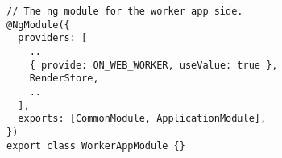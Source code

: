 \begin{verbatim}
// The ng module for the worker app side.
@NgModule({
  providers: [
    ..
    { provide: ON_WEB_WORKER, useValue: true },
    RenderStore,
    ..
  ],
  exports: [CommonModule, ApplicationModule],
})
export class WorkerAppModule {}
\end{verbatim}
